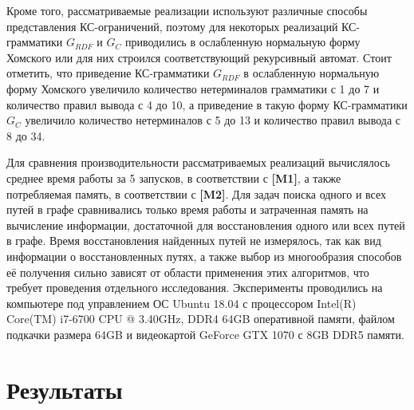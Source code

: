 Кроме того, рассматриваемые реализации используют различные способы представления КС-ограничений, поэтому для некоторых реализаций КС-грамматики $G_{\textit{RDF}}$ и $G_C$ приводились в ослабленную нормальную форму Хомского или для них строился соответствующий рекурсивный автомат. Стоит отметить, что приведение КС-грамматики $G_{\textit{RDF}}$ в ослабленную нормальную форму Хомского увеличило количество нетерминалов грамматики с 1 до 7 и количество правил вывода с 4 до 10, а приведение в такую форму КС-грамматики $G_C$ увеличило количество нетерминалов с 5 до 13 и количество правил вывода с 8 до 34.

Для сравнения производительности рассматриваемых реализаций вычислялось среднее время работы за 5 запусков, в соответствии с \textbf{[M1]}, а также потребляемая память, в соответствии с \textbf{[M2]}. Для задач поиска одного и всех путей в графе сравнивались только время работы и затраченная память на вычисление информации, достаточной для восстановления одного или всех путей в графе. Время восстановления найденных путей не измерялось, так как вид информации о восстановленных путях, а также выбор из многообразия способов её получения сильно зависят от области применения этих алгоритмов, что требует проведения отдельного исследования. Эксперименты проводились на компьютере под управлением ОС Ubuntu 18.04 с процессором Intel(R) Core(TM) i7-6700 CPU @ 3.40GHz, DDR4 64GB оперативной памяти, файлом подкачки размера 64GB и видеокартой GeForce GTX 1070 с 8GB DDR5 памяти.

\section{Результаты}\label{sec:ch5/sect2}

